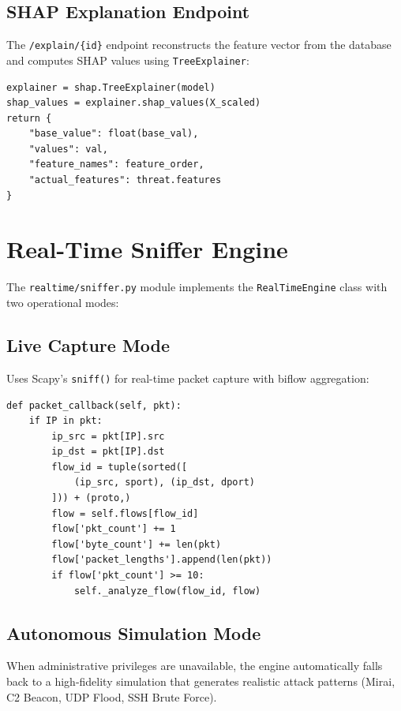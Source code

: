 \subsection{SHAP Explanation Endpoint}

The \texttt{/explain/\{id\}} endpoint reconstructs the feature vector from the database and computes SHAP values using \texttt{TreeExplainer}:

\begin{lstlisting}[caption={SHAP Integration in API}, label={lst:shap_api}]
explainer = shap.TreeExplainer(model)
shap_values = explainer.shap_values(X_scaled)
return {
    "base_value": float(base_val),
    "values": val,
    "feature_names": feature_order,
    "actual_features": threat.features
}
\end{lstlisting}

\section{Real-Time Sniffer Engine}

The \texttt{realtime/sniffer.py} module implements the \texttt{RealTimeEngine} class with two operational modes:

\subsection{Live Capture Mode}

Uses Scapy's \texttt{sniff()} for real-time packet capture with biflow aggregation:

\begin{lstlisting}[caption={Biflow-Based Packet Processing}, label={lst:sniffer}]
def packet_callback(self, pkt):
    if IP in pkt:
        ip_src = pkt[IP].src
        ip_dst = pkt[IP].dst
        flow_id = tuple(sorted([
            (ip_src, sport), (ip_dst, dport)
        ])) + (proto,)
        flow = self.flows[flow_id]
        flow['pkt_count'] += 1
        flow['byte_count'] += len(pkt)
        flow['packet_lengths'].append(len(pkt))
        if flow['pkt_count'] >= 10:
            self._analyze_flow(flow_id, flow)
\end{lstlisting}

\subsection{Autonomous Simulation Mode}

When administrative privileges are unavailable, the engine automatically falls back to a high-fidelity simulation that generates realistic attack patterns (Mirai, C2 Beacon, UDP Flood, SSH Brute Force).

